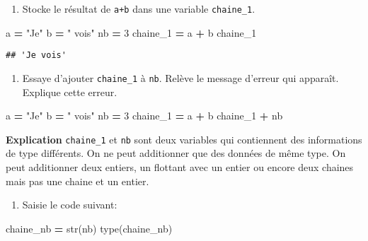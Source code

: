 \documentclass[
]{book}
\newenvironment{Shaded}{\begin{snugshade}}{\end{snugshade}}
\newcommand{\BuiltInTok}[1]{#1}
\newcommand{\DecValTok}[1]{\textcolor[rgb]{0.00,0.00,0.81}{#1}}
\newcommand{\NormalTok}[1]{#1}
\newcommand{\OperatorTok}[1]{\textcolor[rgb]{0.81,0.36,0.00}{\textbf{#1}}}
\newcommand{\StringTok}[1]{\textcolor[rgb]{0.31,0.60,0.02}{#1}}
\providecommand{\tightlist}{%
  \setlength{\itemsep}{0pt}\setlength{\parskip}{0pt}}
\def\tightlist{}
\begin{document}
\begin{enumerate}
\def\labelenumi{\arabic{enumi}.}
\setcounter{enumi}{2}
\tightlist
\item
  Stocke le résultat de \texttt{a+b} dans une variable \texttt{chaine\_1}.
\end{enumerate}

\begin{Shaded}
\begin{Highlighting}[]
\NormalTok{a }\OperatorTok{=} \StringTok{"Je"}
\NormalTok{b }\OperatorTok{=} \StringTok{" vois"}
\NormalTok{nb }\OperatorTok{=} \DecValTok{3}
\NormalTok{chaine\_1 }\OperatorTok{=}\NormalTok{ a }\OperatorTok{+}\NormalTok{ b}
\NormalTok{chaine\_1}
\end{Highlighting}
\end{Shaded}

\begin{verbatim}
## 'Je vois'
\end{verbatim}

\begin{enumerate}
\def\labelenumi{\arabic{enumi}.}
\setcounter{enumi}{3}
\tightlist
\item
  Essaye d'ajouter \texttt{chaine\_1} à \texttt{nb}. Relève le message d'erreur qui apparaît. Explique cette erreur.
\end{enumerate}

\begin{Shaded}
\begin{Highlighting}[]
\NormalTok{a }\OperatorTok{=} \StringTok{"Je"}
\NormalTok{b }\OperatorTok{=} \StringTok{" vois"}
\NormalTok{nb }\OperatorTok{=} \DecValTok{3}
\NormalTok{chaine\_1 }\OperatorTok{=}\NormalTok{ a }\OperatorTok{+}\NormalTok{ b}
\NormalTok{chaine\_1 }\OperatorTok{+}\NormalTok{ nb}
\end{Highlighting}
\end{Shaded}

\textbf{Explication} \texttt{chaine\_1} et \texttt{nb} sont deux variables qui contiennent des informations de type différents. On ne peut additionner que des données de même type. On peut additionner deux entiers, un flottant avec un entier ou encore deux chaines mais pas une chaine et un entier.

\begin{enumerate}
\def\labelenumi{\arabic{enumi}.}
\setcounter{enumi}{4}
\tightlist
\item
  Saisie le code suivant:
\end{enumerate}

\begin{Shaded}
\begin{Highlighting}[]
\NormalTok{chaine\_nb }\OperatorTok{=} \BuiltInTok{str}\NormalTok{(nb)}
\BuiltInTok{type}\NormalTok{(chaine\_nb)}
\end{Highlighting}
\end{Shaded}
\end{document}
